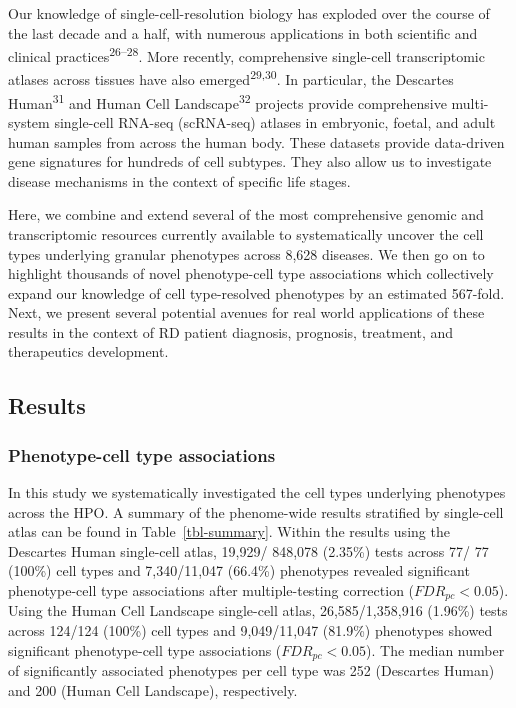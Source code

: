 \documentclass[
]{agujournal2019}
\begin{document}
Our knowledge of single-cell-resolution biology has exploded over the
course of the last decade and a half, with numerous applications in both
scientific and clinical practices\textsuperscript{26--28}. More
recently, comprehensive single-cell transcriptomic atlases across
tissues have also emerged\textsuperscript{29,30}. In particular, the
Descartes Human\textsuperscript{31} and Human Cell
Landscape\textsuperscript{32} projects provide comprehensive
multi-system single-cell RNA-seq (scRNA-seq) atlases in embryonic,
foetal, and adult human samples from across the human body. These
datasets provide data-driven gene signatures for hundreds of cell
subtypes. They also allow us to investigate disease mechanisms in the
context of specific life stages.

Here, we combine and extend several of the most comprehensive genomic
and transcriptomic resources currently available to systematically
uncover the cell types underlying granular phenotypes across 8,628
diseases. We then go on to highlight thousands of novel phenotype-cell
type associations which collectively expand our knowledge of cell
type-resolved phenotypes by an estimated 567-fold. Next, we present
several potential avenues for real world applications of these results
in the context of RD patient diagnosis, prognosis, treatment, and
therapeutics development.

\subsection{Results}\label{sec-results}

\subsubsection{Phenotype-cell type
associations}\label{phenotype-cell-type-associations}

In this study we systematically investigated the cell types underlying
phenotypes across the HPO. A summary of the phenome-wide results
stratified by single-cell atlas can be found in Table~\ref{tbl-summary}.
Within the results using the Descartes Human single-cell atlas, 19,929/
848,078 (2.35\%) tests across 77/ 77 (100\%) cell types and 7,340/11,047
(66.4\%) phenotypes revealed significant phenotype-cell type
associations after multiple-testing correction (\(FDR_{pc}<0.05\)).
Using the Human Cell Landscape single-cell atlas, 26,585/1,358,916
(1.96\%) tests across 124/124 (100\%) cell types and 9,049/11,047
(81.9\%) phenotypes showed significant phenotype-cell type associations
(\(FDR_{pc}<0.05\)). The median number of significantly associated
phenotypes per cell type was 252 (Descartes Human) and 200 (Human Cell
Landscape), respectively.
\end{document}
